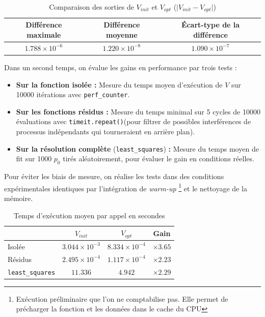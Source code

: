 \documentclass[11pt, a4paper, openany]{report}
\begin{document}
\begin{table}[H]
  \caption{Comparaison des sorties de $V_{init}$ et $V_{opt}$ ($\vert V_{init}-V_{opt} \vert$)}
  \begin{center}
    \begin{tabular}[c]{ccc}
      \hline
      \multicolumn{1}{c}{\textbf{Différence maximale}} & 
      \multicolumn{1}{c}{\textbf{Différence moyenne}} & 
      \multicolumn{1}{c}{\textbf{Écart-type de la différence}} \\
      \hline
      $1.788 \times 10^{-6}$ & $1.220 \times 10^{-8}$ & $1.090 \times 10^{-7}$\\
      \hline
    \end{tabular}
  \end{center}
\end{table}

\newpage
\noindent Dans un second temps, on évalue les gains en performance par trois
tests :
\begin{itemize}
  \item \textbf{Sur la fonction isolée :} Mesure du temps moyen d'exécution de
    $V$ sur 10000 itérations avec \verb|perf_counter|.
  \item \textbf{Sur les fonctions résidus :} Mesure du temps minimal sur 
    5 cycles de 10000 évaluations avec \verb|timeit.repeat()|(pour filtrer de
    possibles interférences de processus indépendants qui tourneraient en 
    arrière plan).
  \item \textbf{Sur la résolution complète} (\verb|least_squares|) \textbf{:} 
    Mesure du temps moyen de fit sur 1000 $p_0$ tirés aléatoirement, pour évaluer 
    le gain en conditions réelles.
\end{itemize}

\noindent Pour éviter les biais de mesure, on réalise les tests dans 
des conditions expérimentales identiques par l'intégration de \textit{warm-up}
\footnote{Exécution préliminaire que l'on ne comptabilise pas. Elle permet 
de précharger la fonction et les données dans le cache du CPU}
et le nettoyage de la mémoire.

\begin{table}[H]
  \caption{Temps d'exécution moyen par appel en secondes}
  \begin{center}
    \begin{tabular}[c]{|lcc|r|}
      \hline
      \multicolumn{1}{|c}{\textbf{}} & 
      \multicolumn{1}{c}{$V_{init}$} & 
      \multicolumn{1}{c|}{$V_{opt}$} & 
      \multicolumn{1}{c|}{Gain} \\
      \hline
      Isolée & $3.044 \times 10^{-3}$ & $8.334 \times 10^{-4}$ & $\times 3.65$ \\
      Résidus & $2.495 \times 10^{-4}$ & $1.117 \times 10^{-4}$ &  $\times 2.23$\\
      \texttt{least\_squares} & $11.336$ & $4.942$ & $\times 2.29$ \\
      
      \hline
    \end{tabular}
  \end{center}
\end{table}
\end{document}
